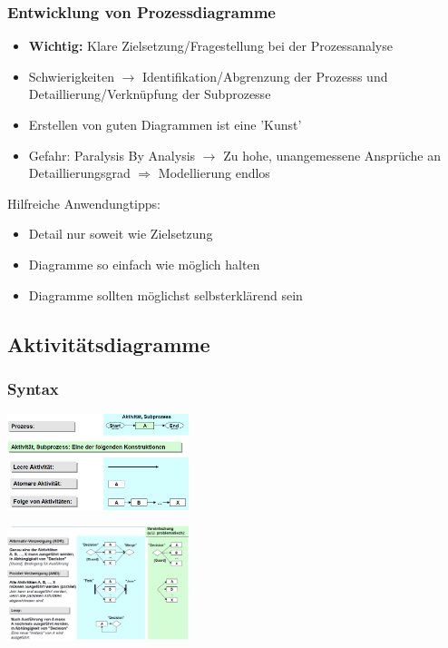 \documentclass{report}
\newenvironment{Figure}
	{\par\medskip\noindent\minipage{\linewidth}}
	{\endminipage\par\medskip}
\theoremstyle{definition}
\theoremstyle{example}
\begin{document}
      \subsubsection{Entwicklung von Prozessdiagramme}
\begin{itemize}
   \item \textbf{Wichtig:} Klare Zielsetzung/Fragestellung bei der Prozessanalyse
   \item Schwierigkeiten $\rightarrow$ Identifikation/Abgrenzung der Prozesss und Detaillierung/Verknüpfung der Subprozesse
   \item Erstellen von guten Diagrammen ist eine 'Kunst'
   \item Gefahr: Paralysis By Analysis $\rightarrow$ Zu hohe, unangemessene Ansprüche an Detaillierungsgrad $\Rightarrow$ Modellierung endlos
\end{itemize}

Hilfreiche Anwendungtipps:
\begin{itemize}
   \item Detail nur soweit wie Zielsetzung
   \item Diagramme so einfach wie möglich halten
   \item Diagramme sollten möglichst selbsterklärend sein
\end{itemize}

   \subsection{Aktivitätsdiagramme}
      \subsubsection{Syntax}

\begin{Figure}
\centering
\includegraphics[width=200px]{img/AkDiaSyntaxI.png}
	\label{fig:Syntax der Aktivitätsdiagramme}
\end{Figure}

\begin{Figure}
\centering
\includegraphics[width=200px]{img/AkDiaSyntaxII.png}
	\label{fig:Syntax der Aktivitätsdiagramme II}
\end{Figure}
\end{document}
